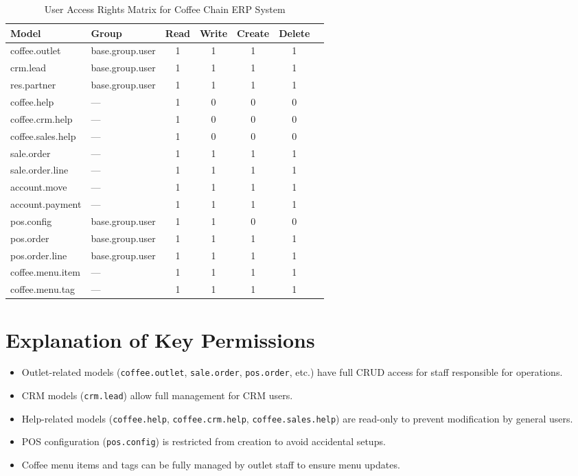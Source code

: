 \begin{table}[H]
\centering
\begin{tabular}{|p{5cm}|p{4cm}|c|c|c|c|c|}
\hline
\textbf{Model} & \textbf{Group} & \textbf{Read} & \textbf{Write} & \textbf{Create} & \textbf{Delete} \\
\hline
coffee.outlet & base.group.user & 1 & 1 & 1 & 1 \\
crm.lead & base.group.user & 1 & 1 & 1 & 1 \\
res.partner & base.group.user & 1 & 1 & 1 & 1 \\
coffee.help & — & 1 & 0 & 0 & 0 \\
coffee.crm.help & — & 1 & 0 & 0 & 0 \\
coffee.sales.help & — & 1 & 0 & 0 & 0 \\
sale.order & — & 1 & 1 & 1 & 1 \\
sale.order.line & — & 1 & 1 & 1 & 1 \\
account.move & — & 1 & 1 & 1 & 1 \\
account.payment & — & 1 & 1 & 1 & 1 \\
pos.config & base.group.user & 1 & 1 & 0 & 0 \\
pos.order & base.group.user & 1 & 1 & 1 & 1 \\
pos.order.line & base.group.user & 1 & 1 & 1 & 1 \\
coffee.menu.item & — & 1 & 1 & 1 & 1 \\
coffee.menu.tag & — & 1 & 1 & 1 & 1 \\
\hline
\end{tabular}
\caption{User Access Rights Matrix for Coffee Chain ERP System}
\end{table}




\section*{Explanation of Key Permissions}
\begin{itemize}
    \item Outlet-related models (\texttt{coffee.outlet}, \texttt{sale.order}, \texttt{pos.order}, etc.) have full CRUD access for staff responsible for operations.
    \item CRM models (\texttt{crm.lead}) allow full management for CRM users.
    \item Help-related models (\texttt{coffee.help}, \texttt{coffee.crm.help}, \texttt{coffee.sales.help}) are read-only to prevent modification by general users.
    \item POS configuration (\texttt{pos.config}) is restricted from creation to avoid accidental setups.
    \item Coffee menu items and tags can be fully managed by outlet staff to ensure menu updates.
\end{itemize}

